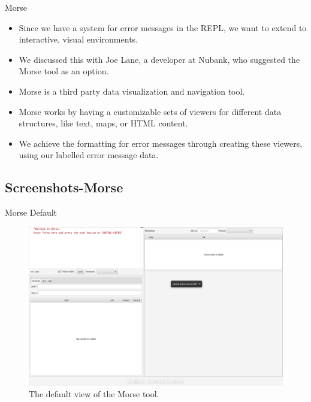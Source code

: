 \documentclass{beamer}
\begin{document}
\begin{frame}{Morse}
  \begin{itemize}
    \item<1-> Since we have a system for error messages in the REPL, we want to extend to interactive, visual environments.
    \item<2-> We discussed this with Joe Lane, a developer at Nubank, who suggested the Morse tool as an option.
    \item<3-> Morse is a third party data visualization and navigation tool.
    \item<4-> Morse works by having a customizable sets of viewers for different data structures, like text, maps, or HTML content.
    \item<5-> We achieve the formatting for error messages through creating these viewers, using our labelled error message data.
  \end{itemize}
\end{frame}

\subsection{Screenshots-Morse}
\begin{frame}{Morse Default}
  \begin{figure}
    \centering
    \includegraphics[height=0.7\textheight]{../resources/MorseDefault.jpg}
    \caption{The default view of the Morse tool.}
    \label{fig:defaultMorse}
  \end{figure}
\end{frame}
\end{document}
